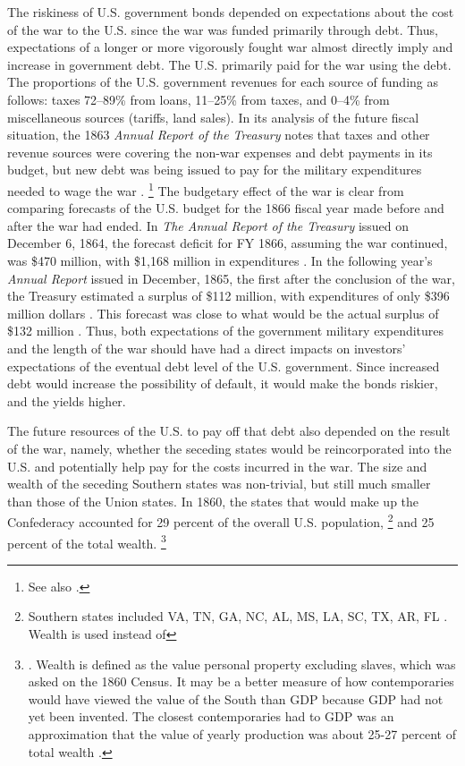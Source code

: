 The riskiness of U.S. government bonds depended on expectations about the cost of the war to the U.S. since the war was funded primarily through debt.
Thus, expectations of a longer or more vigorously fought war almost directly imply and increase in government debt.
The U.S. primarily paid for the war using the debt. 
The proportions of the U.S. government revenues for each source of funding as follows: taxes 72--89\% from loans, 11--25\% from taxes, and 0--4\% from miscellaneous sources (tariffs, land sales).
In its analysis of the future fiscal situation, the 1863 \textit{Annual Report of the Treasury} notes that taxes and other revenue sources were covering the non-war expenses and debt payments in its budget, but new debt was being issued to pay for the military expenditures needed to wage the war \parencite[10-13]{Treasury1863}.
\footnote{See also \textcite[][14]{Godfrey1976}.}
The budgetary effect of the war is clear from  comparing forecasts of the U.S. budget for the 1866 fiscal year made before and after the war had ended.
In \textit{The Annual Report of the  Treasury} issued on December 6, 1864, the forecast deficit for FY 1866, assuming the war continued, was \$470 million, with \$1,168 million in expenditures \parencite[13]{Treasury1864}.
In the following year's \textit{Annual Report} issued in December, 1865, the first after the conclusion of the war, the Treasury estimated a surplus of \$112 million, with expenditures of only \$396 million dollars \parencite{Treasury1865}.
This forecast was close to what would be the actual surplus of \$132 million \parencite[2]{Treasury1866}.
Thus, both expectations of the government military expenditures and the length of the war should have had a direct impacts on investors' expectations of the eventual debt level of the U.S. government.
Since increased debt would increase the possibility of default, it would make the bonds riskier, and the yields higher.

The future resources of the U.S. to pay off that debt also depended on the result of the war, namely, whether the seceding states would be reincorporated into the U.S. and potentially help pay for the costs incurred in the war.
The size and wealth of the seceding Southern states was non-trivial, but still much smaller than those of the Union states.
In 1860, the states that would make up the Confederacy accounted for 29 percent of the overall U.S. population,%
\footnote{
  Southern states included VA, TN, GA, NC, AL, MS, LA, SC, TX, AR, FL \textcite[5]{Eicher2001}.
  Wealth is used instead of 
}
and 25 percent of the total wealth.%
\footnote{
  \textcite[12]{Elder1865}. Wealth is defined as the value personal property excluding slaves, which was asked on the 1860 Census.
  It may be a better measure of how contemporaries would have viewed the value of the South than GDP because GDP had not yet been invented.
  The closest contemporaries had to GDP was an approximation that the value of yearly production was about 25-27 percent of total wealth \parencites[7]{Elder1865}[24]{Treasury1865}.
}

